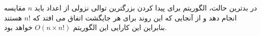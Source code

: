 \documentclass[]{article}
\begin{document}
در بدترین حالت، الگوریتم برای پیدا کردن بزرگترین توالی نزولی از اعداد باید $n$ مقایسه انجام دهد
و از آنجایی که این روند برای هر جایگشت اتفاق می افتد که $n!$
هستند بنابراین این کارایی این الگوریتم
$O(n \times n!)$
خواهد بود.
\end{document}
